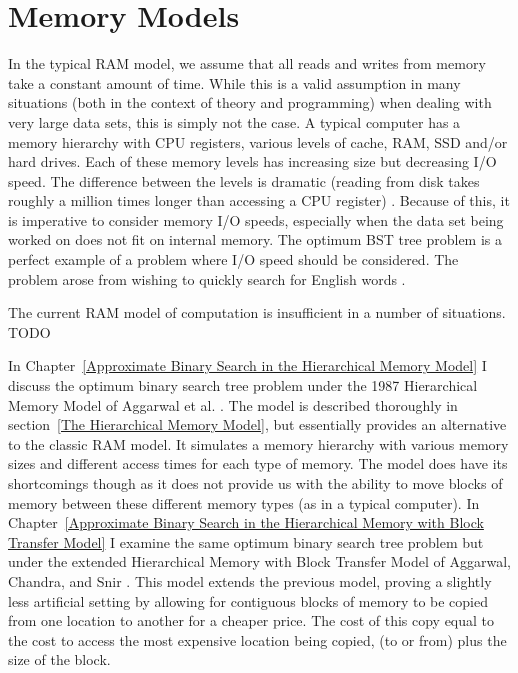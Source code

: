 \documentclass[letterpaper,12pt,titlepage,oneside,final]{book}
\theoremstyle{plain}
\begin{document}
\section{Memory Models}

In the typical RAM model, we assume that all reads and writes from memory take a constant amount of time. While this is a valid assumption in many situations (both in the context of theory and programming) when dealing with very large data sets, this is simply not the case. A typical computer has a memory hierarchy with CPU registers, various levels of cache, RAM, SSD and/or hard drives. Each of these memory levels has increasing size but decreasing I/O speed. The difference between the levels is dramatic (reading from disk takes roughly a million times longer than accessing a CPU register) \cite{vitter2001external}. Because of this, it is imperative to consider memory I/O speeds, especially when the data set being worked on does not fit on internal memory. The optimum BST tree problem is a perfect example of a problem where I/O speed should be considered. The problem arose from wishing to quickly search for English words \cite{}.

The current RAM model of computation is insufficient in a number of situations. TODO

In Chapter~\ref{Approximate Binary Search in the Hierarchical Memory Model} I discuss the optimum binary search tree problem under the 1987 Hierarchical Memory Model of Aggarwal et al. \cite{aggarwal1987model}. The model is described thoroughly in section~\ref{The Hierarchical Memory Model}, but essentially provides an alternative to the classic RAM model. It simulates a memory hierarchy with various memory sizes and different access times for each type of memory. The model does have its shortcomings though as it does not provide us with the ability to move blocks of memory between these different memory types (as in a typical computer). In Chapter~\ref{Approximate Binary Search in the Hierarchical Memory with Block Transfer Model} I examine the same optimum binary search tree problem but under the extended Hierarchical Memory with Block Transfer Model of Aggarwal, Chandra, and Snir \cite{aggarwal1987hierarchical}. This model extends the previous model, proving a slightly less artificial setting by allowing for contiguous blocks of memory to be copied from one location to another for a cheaper price. The cost of this copy equal to the cost to access the most expensive location being copied, (to or from) plus the size of the block. \\
\end{document}
